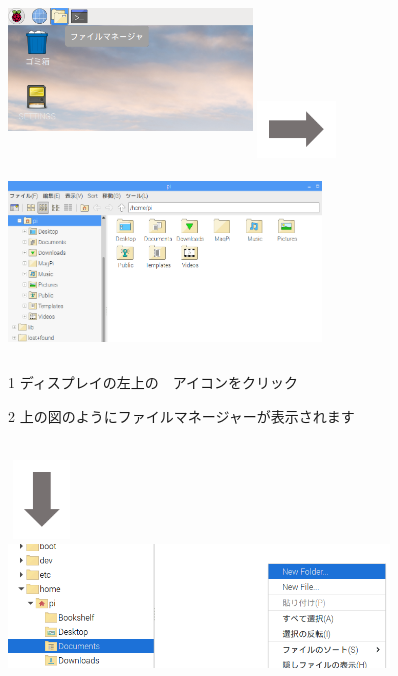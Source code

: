 \documentclass[a4paper,12pt]{jarticle}
\begin{document}
\begin{figure}[ht]
  \begin{minipage}{\textwidth}
    \includegraphics[width=6.472cm,height=4.976cm]{textbook-img032.png}
    \includegraphics[width=2.094cm,height=1.771cm]{textbook-img035.png}
    \includegraphics[width=8.301cm,height=4.948cm]{textbook-img033.png}
  \end{minipage}
  \begin{minipage}{0.4\textwidth}
    1
    ディスプレイの左上の　アイコンをクリック
  \end{minipage}
  \hfill
  \begin{minipage}{0.4\textwidth}
    2
    上の図のようにファイルマネージャーが表示されます
  \end{minipage}\\
  \vspace{-12mm}
  \hfill \includegraphics[width=1.771cm,height=2.094cm]{textbook-img037.png}
  \includegraphics[width=0.9\textwidth]{textbook-img034.png}

\end{figure}
\end{document}
